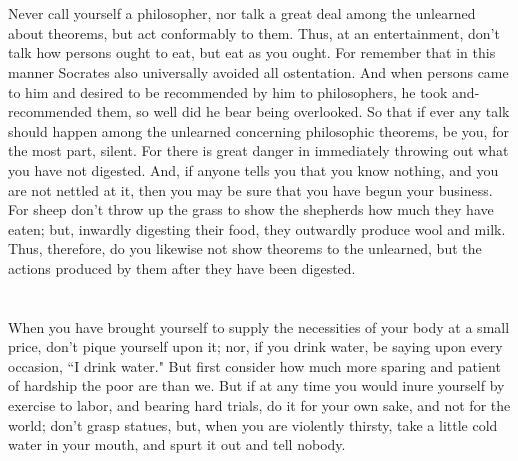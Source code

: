 \documentclass[12pt]{article}
\begin{document}
\section{}

Never call yourself a philosopher, nor talk a great deal among
the unlearned about theorems, but act conformably to them. Thus, at
an entertainment, don't talk how persons ought to eat, but eat as
you ought. For remember that in this manner Socrates also universally
avoided all ostentation. And when persons came to him and desired
to be recommended by him to philosophers, he took and- recommended
them, so well did he bear being overlooked. So that if ever any talk
should happen among the unlearned concerning philosophic theorems,
be you, for the most part, silent. For there is great danger in immediately
throwing out what you have not digested. And, if anyone tells you
that you know nothing, and you are not nettled at it, then you may
be sure that you have begun your business. For sheep don't throw up
the grass to show the shepherds how much they have eaten; but, inwardly
digesting their food, they outwardly produce wool and milk. Thus,
therefore, do you likewise not show theorems to the unlearned, but
the actions produced by them after they have been digested.

\section{}

When you have brought yourself to supply the necessities of your
body at a small price, don't pique yourself upon it; nor, if you drink
water, be saying upon every occasion, ``I drink water." But first consider
how much more sparing and patient of hardship the poor are than we.
But if at any time you would inure yourself by exercise to labor,
and bearing hard trials, do it for your own sake, and not for the
world; don't grasp statues, but, when you are violently thirsty, take
a little cold water in your mouth, and spurt it out and tell nobody.

\section{}
\end{document}
